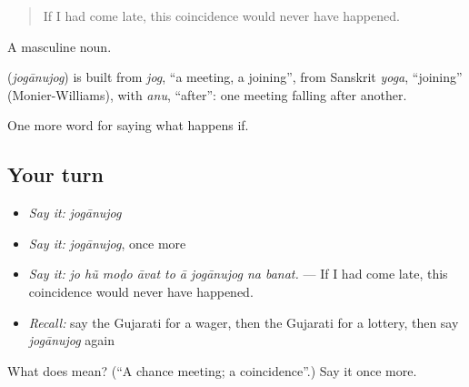 \begin{quote}
If I had come late, this coincidence would never have happened.
\end{quote}

A masculine noun.

\begin{cousinweb}
\textbf{} (\emph{jogānujog}) is built from \emph{jog}, \textquotedblleft{}a meeting, a joining\textquotedblright{}, from Sanskrit \emph{yoga}, \textquotedblleft{}joining\textquotedblright{} (Monier-Williams), with \emph{anu}, \textquotedblleft{}after\textquotedblright{}: one meeting falling after another.
\end{cousinweb}

\begin{grammarlens}[title={What you've built}]
One more word for saying what happens if.
\end{grammarlens}

\subsection*{Your turn}
\begin{itemize}
\raggedright
  \item \emph{Say it:} \emph{jogānujog}
  \item \emph{Say it:} \emph{jogānujog}, once more
  \item \emph{Say it:} \emph{jo hũ moḍo āvat to ā jogānujog na banat.} — If I had come late, this coincidence would never have happened.
  \item \emph{Recall:} say the Gujarati for a wager, then the Gujarati for a lottery, then say \emph{jogānujog} again
\end{itemize}

\begin{tcolorbox}[breakable,colback=teal!4,colframe=teal!35!black,title={Before you move on}]
What does  mean? (\textquotedblleft{}A chance meeting; a coincidence\textquotedblright{}.) Say it once more.
\end{tcolorbox}
